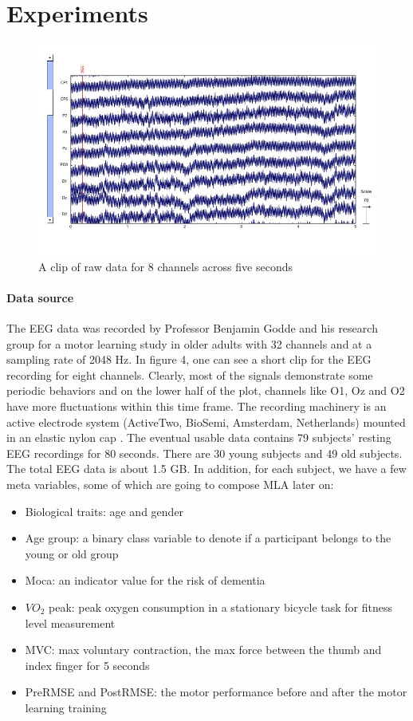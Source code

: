 \documentclass[a4paper,11pt,oneside]{article}
\begin{document}
\section{Experiments}
\begin{figure}[h]
	\centering
	\includegraphics[width=1.0\textwidth]{img/visu}
	\caption{A clip of raw data for 8 channels across five seconds}
\end{figure}


\paragraph{Data source} The EEG data was recorded by Professor Benjamin Godde and his research group for a motor learning study in older adults with 32 channels and at a sampling rate of 2048 Hz. In figure 4, one can see a short clip for the EEG recording for eight channels. Clearly, most of the signals demonstrate some periodic behaviors and on the lower half of the plot, channels like O1, Oz and O2 have more fluctuations within this time frame.  The recording machinery is an active electrode system (ActiveTwo, BioSemi, Amsterdam, Netherlands) mounted in an elastic nylon cap \cite{jasper1958ten}. The eventual usable data contains 79 subjects' resting EEG recordings for 80 seconds. There are 30 young subjects and 49 old subjects. The total EEG data is about 1.5 GB. In addition, for each subject, we have a few meta variables, some of which are going to compose MLA later on:
\begin{itemize}
	\item Biological traits: age and gender
	\item Age group: a binary class variable to denote if a participant belongs to the young or old group
	\item Moca: an indicator value for the risk of dementia
	\item $VO_2$ peak: peak oxygen consumption in a stationary bicycle task for fitness level measurement
	 \item MVC: max voluntary contraction, the max force between the thumb and index finger for 5 seconds 
	 \item PreRMSE and PostRMSE: the motor performance before and after the motor learning training
\end{itemize}
\end{document}
